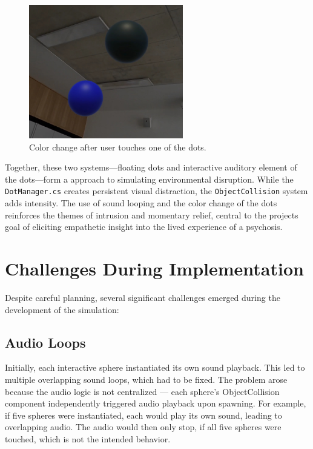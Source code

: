 \begin{figure}[H]
    \centering
    \includegraphics[width=0.6\textwidth]{../../Figures/dots-after-touch.jpg}
    \caption{Color change after user touches one of the dots.}
    \label{fig:dots_after}
\end{figure}


Together, these two systems—floating dots and interactive auditory element of the dots—form a approach to simulating environmental disruption. While the \texttt{DotManager.cs} creates persistent visual distraction, the \texttt{ObjectCollision} system adds intensity. The use of sound looping and the color change of the dots reinforces the themes of intrusion and momentary relief, central to the projects goal of eliciting empathetic insight into the lived experience of a psychosis.


\section{Challenges During Implementation} 
Despite careful planning, several significant challenges emerged during the development of the simulation:

\subsection{Audio Loops} 
Initially, each interactive sphere instantiated its own sound playback. This led to multiple overlapping sound loops, which had to be fixed. The problem arose because the audio logic is not centralized — each sphere's ObjectCollision component independently triggered audio playback upon spawning. For example, if five spheres were instantiated, each would play its own sound, leading to overlapping audio. The audio would then only stop, if all five spheres were touched, which is not the intended behavior.

